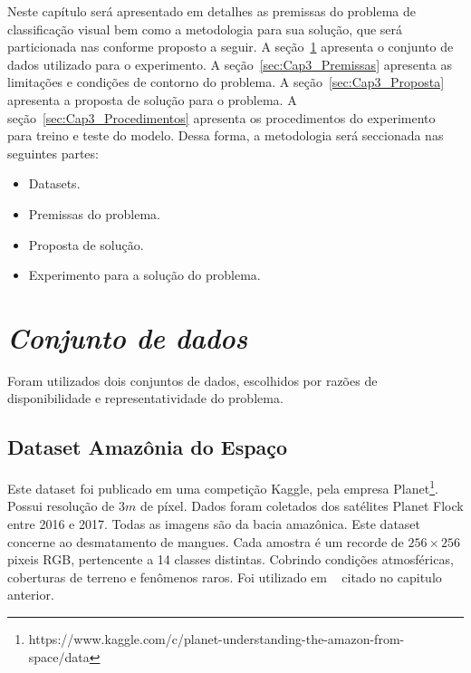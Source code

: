 Neste capítulo será apresentado em detalhes as premissas do problema de classificação visual bem como a metodologia para sua solução, que será particionada nas conforme proposto a seguir. A seção~\ref{sec:Cap3_Dataset} apresenta o conjunto de dados utilizado para o experimento.  A seção~\ref{sec:Cap3_Premissas} apresenta as limitações e condições de contorno do problema. A seção~\ref{sec:Cap3_Proposta} apresenta a proposta de solução para o problema. A seção~\ref{sec:Cap3_Procedimentos} apresenta os procedimentos do experimento para treino e teste do modelo. Dessa forma, a metodologia será seccionada nas seguintes partes:

\begin{itemize}
    \item  Datasets.
    \item  Premissas do problema.
    \item  Proposta de solução.
    \item  Experimento para a solução do problema.

\end{itemize}


\section{\textit{Conjunto de dados}}\label{sec:Cap3_Dataset}
Foram utilizados dois conjuntos de dados, escolhidos por razões de disponibilidade e representatividade do problema. 


\subsection{Dataset Amazônia do Espaço}\label{sec:Cap3_Amazon_dataset}

Este dataset foi publicado em uma competição Kaggle, pela empresa Planet\footnote{https://www.kaggle.com/c/planet-understanding-the-amazon-from-space/data}. Possui resolução de $3 m$ de píxel. Dados foram coletados dos satélites Planet Flock entre 2016 e 2017. Todas as imagens são da bacia amazônica. Este dataset concerne ao desmatamento de mangues. Cada amostra é um recorde de $256 \times 256$ pixeis RGB, pertencente a 14 classes distintas. Cobrindo condições atmosféricas, coberturas de terreno e fenômenos raros. Foi utilizado em ~\cite{9701667} citado no capitulo anterior.

